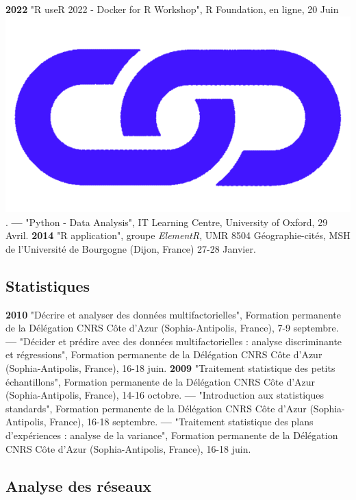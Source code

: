 \documentclass{article}
\begin{document}
\textbf{2022 }"\textsf{R} useR 2022 - Docker for R Workshop", R Foundation, en ligne, 20 Juin \href{https://github.com/rsangole/user2022-r-for-docker}{\includegraphics[scale=0.02]{link_darkblue.png}}.
\smallbreak
\textbf{--- }"\textsf{Python} - Data Analysis", IT Learning Centre, University of Oxford, 29 Avril.
\smallbreak
\textbf{2014 }"\textsf{R} application", groupe \textit{ElementR}, UMR 8504 G\'{e}ographie-cit\'{e}s, MSH de l'Universit\'{e} de Bourgogne (Dijon, France) 27-28 Janvier.
\smallbreak

\subsection*{Statistiques}

\textbf{2010 }"Décrire et analyser des données multifactorielles", Formation permanente de la Délégation CNRS Côte d'Azur (Sophia-Antipolis, France), 7-9 septembre.
\smallbreak
\textbf{--- }"Décider et prédire avec des données multifactorielles : analyse discriminante et régressions", Formation permanente de la Délégation CNRS Côte d'Azur (Sophia-Antipolis, France), 16-18 juin.
\smallbreak
\textbf{2009 }"Traitement statistique des petits échantillons", Formation permanente de la Délégation CNRS Côte d'Azur (Sophia-Antipolis, France), 14-16 octobre.
\smallbreak
\textbf{--- }"Introduction aux statistiques standards", Formation permanente de la Délégation CNRS Côte d'Azur (Sophia-Antipolis, France), 16-18 septembre.
\smallbreak
\textbf{--- }"Traitement statistique des plans d'expériences : analyse de la variance", Formation permanente de la Délégation CNRS Côte d'Azur (Sophia-Antipolis, France), 16-18 juin.
\smallbreak

\subsection*{Analyse des réseaux}
\end{document}
